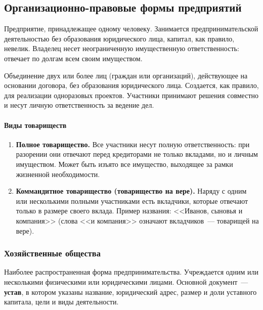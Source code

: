 \documentclass[12pt]{article}
\begin{document}
	\subsection{Организационно-правовые формы предприятий}

	\begin{definition}
		Предприятие, принадлежащее одному человеку. Занимается предпринимательской деятельностью без образования юридического лица, капитал, как правило, невелик. Владелец несет неограниченную имущественную ответственность: отвечает по долгам всем своим имуществом.
	\end{definition}

	\begin{definition}
		Объединение двух или более лиц (граждан или организаций), действующее на основании договора, без образования юридического лица. Создается, как правило, для реализации одноразовых проектов. Участники принимают решения совместно и несут личную ответственность за ведение дел.
	\end{definition}

	\paragraph{Виды товариществ}
	\begin{enumerate}
		\item \textbf{Полное товарищество.} Все участники несут полную ответственность: при разорении они отвечают перед кредиторами не только вкладами, но и личным имуществом. Может быть изъято все имущество, выходящее за рамки жизненной необходимости.
		\item \textbf{Коммандитное товарищество (товарищество на вере).} Наряду с одним или несколькими полными участниками есть вкладчики, которые отвечают только в размере своего вклада. Пример названия: <<Иванов, сыновья и компания>> (слова <<и компания>> означают вкладчиков~--- товарищей на вере).
	\end{enumerate}

	\subsubsection{Хозяйственные общества}

	\begin{definition}
		Наиболее распространенная форма предпринимательства. Учреждается одним или несколькими физическими или юридическими лицами. Основной документ~--- \textbf{устав}, в котором указаны название, юридический адрес, размер и доли уставного капитала, цели и виды деятельности.
	\end{definition}
\end{document}
